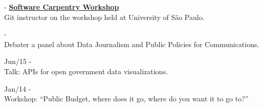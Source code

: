 \documentclass[]{friggeri-cv}
\begin{document}
{\footnotesize{}} - \href{http://rgaiacs.github.io/2015-09-10-usp/}{\textbf{Software Carpentry Workshop}}\\
           {Git instructor on the workshop held at University of São Paulo}.

{\footnotesize{}} - \href{https://portaldoaluno.casperlibero.edu.br/agenda-eventos/semana-de-jornalismo-casper-libero-2/}{\textbf{}}\\
           {Debater a panel about Data Journalism and Public Policies for Communications}.

{\footnotesize{Jun/15}} - \href{https://setemasters.imasters.com.br/edicoes/design-de-apis/}{}\\
%
           {Talk: APIs for open government data visualizations}.

{\footnotesize{Jan/14}} - \href{http://www.techtudo.com.br/noticias/noticia/2014/01/cp2014-campus-party-brasil-2014-guia-traz-principais-atividades-por-perfil.html}{\textbf{}}\\
           {Workshop: ``Public Budget, where does it go, where do you want it to go to?''}
\end{document}
